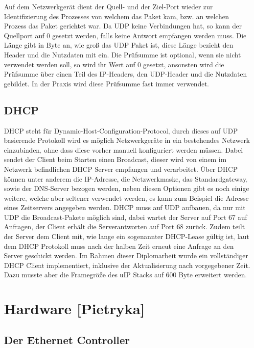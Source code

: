 \documentclass[a4paper,14pt,headsepline]{scrartcl}
\begin{document}
Auf dem Netzwerkgerät dient der Quell- und der Ziel-Port wieder zur Identifizierung des Prozesses von welchem das Paket kam, bzw. an welchen Prozess das Paket gerichtet war. Da UDP keine Verbindungen hat, so kann der Quellport auf 0 gesetzt werden, falls keine Antwort empfangen werden muss. Die Länge gibt in Byte an, wie groß das UDP Paket ist, diese Länge bezieht den Header und die Nutzdaten mit ein. Die Prüfsumme ist optional, wenn sie nicht verwendet werden soll, so wird ihr Wert auf 0 gesetzt, ansonsten wird die Prüfsumme über einen Teil des IP-Headers, den UDP-Header und die Nutzdaten gebildet. In der Praxis wird diese Prüfsumme fast immer verwendet.


\subsection{DHCP}
DHCP steht für Dynamic-Host-Configuration-Protocol, durch dieses auf UDP basierende Protokoll wird es möglich Netzwerkgeräte in ein bestehendes Netzwerk einzubinden, ohne dass diese vorher manuell konfiguriert werden müssen. Dabei sendet der Client beim Starten einen Broadcast, dieser wird von einem im Netzwerk befindlichen DHCP Server empfangen und verarbeitet. Über DHCP können unter anderem die IP-Adresse, die Netzwerkmaske, das Standardgateway, sowie der DNS-Server bezogen werden, neben diesen Optionen gibt es noch einige weitere, welche aber seltener verwendet werden, es kann zum Beispiel die Adresse eines Zeitservers angegeben werden. DHCP muss auf UDP aufbauen, da nur mit UDP die Broadcast-Pakete möglich sind, dabei wartet der Server auf Port 67 auf Anfragen, der Client erhält die Serverantworten auf Port 68 zurück. Zudem teilt der Server dem Client mit, wie lange ein sogenannter DHCP-Lease gültig ist, laut dem DHCP Protokoll muss nach der halben Zeit erneut eine Anfrage an den Server geschickt werden. Im Rahmen dieser Diplomarbeit wurde ein vollständiger DHCP Client implementiert, inklusive der Aktualisierung nach vorgegebener Zeit. Dazu musste aber die Framegröße des uIP Stacks auf 600 Byte erweitert werden.

\newpage
\section{Hardware [Pietryka]}
\subsection{Der Ethernet Controller}
\end{document}
